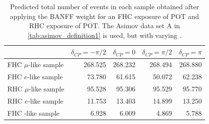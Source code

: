 \begin{table}[H]
\center
\begin{tabular} { | l ||r | r | r | r | }
	\hline
	&	$\delta_{CP}=-\pi/2$	&	$\delta_{CP}=0$	&	$\delta_{CP}=\pi/2$	&	$\delta_{CP}=\pi$	\\ \hline\hline
	FHC $\mu$-like sample			& 268.525 & 268.232 & 268.494 & 268.880 \\ \hline
	FHC $e$-like sample				&  73.780 &  61.615 &  50.072 &  62.238 \\ \hline
	RHC $\mu$-like sample			&  95.528 &  95.306 &  95.529 &  95.770 \\ \hline	
	RHC $e$-like sample				&  11.753 &  13.403 &  14.899 &  13.250 \\ \hline
	FHC \nueCConepi{}-like sample	&   6.928 &   6.009 &   4.869 &   5.788 \\ \hline
\end{tabular}
\caption{
Predicted total number of events in each sample obtained after applying the BANFF weight for \color{blue}an FHC exposure of \TotalPotNu{} POT and RHC exposure of \TotalPotNuBar{} POT\color{black}. The Asimov data set A in \ref{tab:asimov_definition1} is used, but with varying \deltacp.
}
\label{tab:events_asimov_a_dcp_var_1re}
\end{table}
